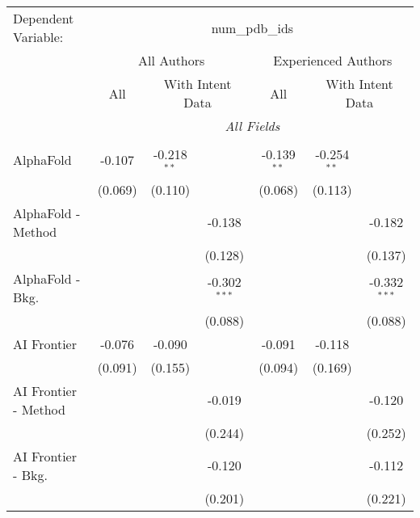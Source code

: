 \begingroup
\centering
\begin{tabular}{lcccccc}
   \tabularnewline \midrule \midrule
   Dependent Variable: & \multicolumn{6}{c}{num\_pdb\_ids}\\
 & \multicolumn{3}{c}{All Authors} & \multicolumn{3}{c}{Experienced Authors} \\
\cmidrule(lr){2-4} \cmidrule(lr){5-7}
 & \multicolumn{1}{c}{All} & \multicolumn{2}{c}{With Intent Data} & \multicolumn{1}{c}{All} & \multicolumn{2}{c}{With Intent Data} \\
\cmidrule(lr){2-2} \cmidrule(lr){3-4} \cmidrule(lr){5-5} \cmidrule(lr){6-7}
 & \multicolumn{6}{c}{\textit{All Fields}} \\ \\
   AlphaFold            & -0.107         & -0.218$^{**}$ &                & -0.139$^{**}$  & -0.254$^{**}$ &   \\   
                        & (0.069)        & (0.110)       &                & (0.068)        & (0.113)       &   \\   
   AlphaFold - Method   &                &               & -0.138         &                &               & -0.182\\   
                        &                &               & (0.128)        &                &               & (0.137)\\   
   AlphaFold - Bkg.     &                &               & -0.302$^{***}$ &                &               & -0.332$^{***}$\\   
                        &                &               & (0.088)        &                &               & (0.088)\\   
   AI Frontier          & -0.076         & -0.090        &                & -0.091         & -0.118        &   \\   
                        & (0.091)        & (0.155)       &                & (0.094)        & (0.169)       &   \\   
   AI Frontier - Method &                &               & -0.019         &                &               & -0.120\\   
                        &                &               & (0.244)        &                &               & (0.252)\\   
   AI Frontier - Bkg.   &                &               & -0.120         &                &               & -0.112\\   
                        &                &               & (0.201)        &                &               & (0.221)\\   

\end{tabular}
